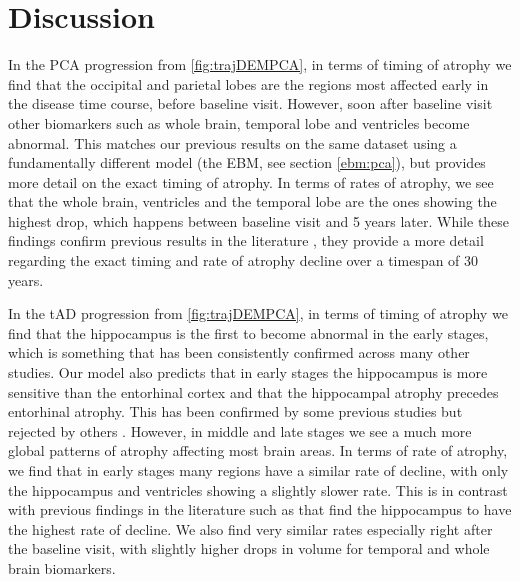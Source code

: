 \section{Discussion}
\label{sec:demDiscussion}

In the PCA progression from \ref{fig:trajDEMPCA}, in terms of timing of atrophy we find that the occipital and parietal lobes are the regions most affected early in the disease time course, before baseline visit. However, soon after baseline visit other biomarkers such as whole brain, temporal lobe and ventricles become abnormal. This matches our previous results on the same dataset using a fundamentally different model (the EBM, see section \ref{ebm:pca}), but provides more detail on the exact timing of atrophy. In terms of rates of atrophy, we see that the whole brain, ventricles and the temporal lobe are the ones showing the highest drop, which happens between baseline visit and 5 years later. While these findings confirm previous results in the literature \cite{lehmann2011cortical,whitwell2007imaging}, they provide a more detail regarding the exact timing and rate of atrophy decline over a timespan of 30 years. 

In the tAD progression from \ref{fig:trajDEMPCA}, in terms of timing of atrophy we find that the hippocampus is the first to become abnormal in the early stages, which is something that has been consistently confirmed across many other studies. Our model also predicts that in early stages the hippocampus is more sensitive than the entorhinal cortex and that the hippocampal atrophy precedes entorhinal atrophy. This has been confirmed by some previous studies \cite{laakso2000hippocampus,fonteijn2012event} but rejected by others \cite{braak1994morphological,pennanen2004hippocampus}. However, in middle and late stages we see a much more global patterns of atrophy affecting most brain areas. In terms of rate of atrophy, we find that in early stages many regions have a similar rate of decline, with only the hippocampus and ventricles showing a slightly slower rate. This is in contrast with previous findings in the literature such as \cite{scahill2002mapping} that find the hippocampus to have the highest rate of decline. We also find very similar rates especially right after the baseline visit, with slightly higher drops in volume for temporal and whole brain biomarkers.

